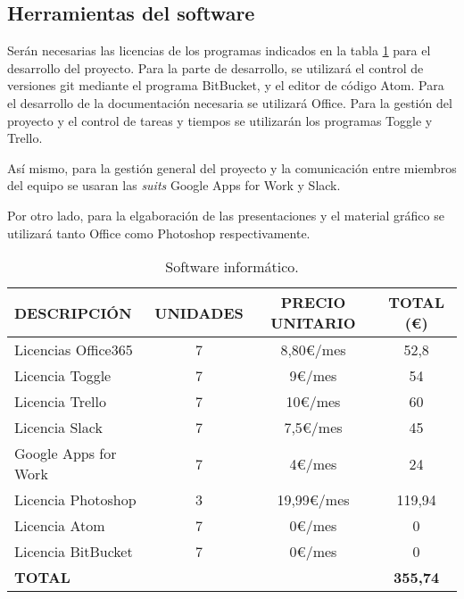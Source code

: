 \subsection{Herramientas del software}
\par Serán necesarias las licencias de los programas indicados en la tabla \ref{tab:software} para el desarrollo del proyecto. Para la parte de desarrollo, se utilizará el control de versiones git mediante el programa BitBucket, y el editor de código Atom. Para el desarrollo de la documentación necesaria se utilizará Office. Para la gestión del proyecto y el control de tareas y tiempos se utilizarán los programas Toggle y Trello.
\par Así mismo, para la gestión general del proyecto y la comunicación entre miembros del equipo se usaran las \textit{suits} Google Apps for Work y Slack.
\par Por otro lado, para la elgaboración de las presentaciones y el material gráfico se utilizará tanto Office como Photoshop respectivamente.


\begin{table}[H]
\begin{center}
\begin{tabular}{l c c c}
\textbf{DESCRIPCIÓN} & \textbf{UNIDADES} & \textbf{PRECIO UNITARIO} & \textbf{TOTAL (\euro)}\\ \hline \hline
Licencias Office365 & 7 & 8,80\euro/mes & 52,8\\
Licencia Toggle & 7 & 9\euro/mes & 54\\
Licencia Trello & 7 & 10\euro/mes & 60\\
Licencia Slack & 7 & 7,5\euro/mes & 45\\
Google Apps for Work & 7 & 4\euro/mes & 24\\
Licencia Photoshop & 3 & 19,99\euro/mes & 119,94\\
Licencia Atom & 7 & 0\euro/mes & 0\\
Licencia BitBucket & 7 & 0\euro/mes & 0\\ \hline \hline
\textbf{TOTAL} & & & \textbf{355,74}\\ \hline
\end{tabular}
\caption{Software informático.}
\label{tab:software}
\end{center}
\end{table}



